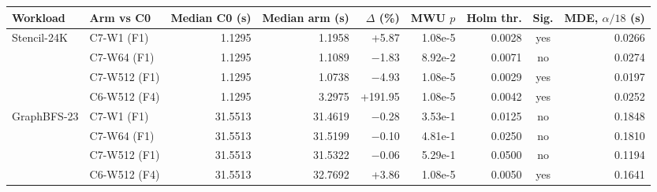 \begin{tabular}{@{}llrrrrrcr@{}}
\toprule
Workload & Arm vs C0 & Median C0 (s) & Median arm (s) & $\Delta$ (\%) & MWU $p$ & Holm thr. & Sig. & MDE, $\alpha/18$ (s) \\
\midrule
Stencil-24K & C7-W1 (F1) & 1.1295 & 1.1958 & +5.87 & 1.08e-5 & 0.0028 & yes & 0.0266 \\ %
 & C7-W64 (F1) & 1.1295 & 1.1089 & $-$1.83 & 8.92e-2 & 0.0071 & no & 0.0274 \\ %
 & C7-W512 (F1) & 1.1295 & 1.0738 & $-$4.93 & 1.08e-5 & 0.0029 & yes & 0.0197 \\ %
 & C6-W512 (F4) & 1.1295 & 3.2975 & +191.95 & 1.08e-5 & 0.0042 & yes & 0.0252 \\ %
\midrule
GraphBFS-23 & C7-W1 (F1) & 31.5513 & 31.4619 & $-$0.28 & 3.53e-1 & 0.0125 & no & 0.1848 \\ %
 & C7-W64 (F1) & 31.5513 & 31.5199 & $-$0.10 & 4.81e-1 & 0.0250 & no & 0.1810 \\ %
 & C7-W512 (F1) & 31.5513 & 31.5322 & $-$0.06 & 5.29e-1 & 0.0500 & no & 0.1194 \\ %
 & C6-W512 (F4) & 31.5513 & 32.7692 & +3.86 & 1.08e-5 & 0.0050 & yes & 0.1641 \\ %
\bottomrule
\end{tabular}
